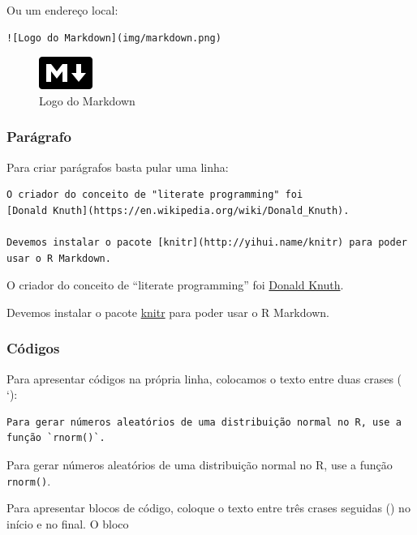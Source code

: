 \documentclass[
  10pt,
  a4paper]{book}
\begin{document}
Ou um endereço local:

\begin{verbatim}
![Logo do Markdown](img/markdown.png)
\end{verbatim}

\begin{figure}
\centering
\includegraphics{img/markdown.png}
\caption{Logo do Markdown}
\end{figure}

\hypertarget{paruxe1grafo}{%
\subsubsection*{Parágrafo}\label{paruxe1grafo}}


Para criar parágrafos basta pular uma linha:

\begin{verbatim}
O criador do conceito de "literate programming" foi
[Donald Knuth](https://en.wikipedia.org/wiki/Donald_Knuth).

Devemos instalar o pacote [knitr](http://yihui.name/knitr) para poder
usar o R Markdown.
\end{verbatim}

O criador do conceito de ``literate programming'' foi
\href{https://en.wikipedia.org/wiki/Donald_Knuth}{Donald Knuth}.

Devemos instalar o pacote \href{http://yihui.name/knitr}{knitr} para poder
usar o R Markdown.

\hypertarget{cuxf3digos}{%
\subsubsection*{Códigos}\label{cuxf3digos}}


Para apresentar códigos na própria linha, colocamos o texto entre duas
crases (\texttt{} `):

\begin{verbatim}
Para gerar números aleatórios de uma distribuição normal no R, use a
função `rnorm()`.
\end{verbatim}

Para gerar números aleatórios de uma distribuição normal no R, use a
função \texttt{rnorm()}.

Para apresentar blocos de código, coloque o texto entre três crases
seguidas (\texttt{\textasciigrave{}\textasciigrave{}\textasciigrave{}}) no início e no final. O bloco
\end{document}
